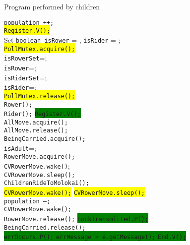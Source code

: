 \documentclass{article}
\begin{document}
\begin{spacing}{1.1}
\begin{algorithm}[bpth]
\caption{Program performed by children}
\begin{algorithmic}[1]
  \STATE \texttt{population ++;}\\
  \STATE \colorbox{yellow}{\texttt{Register.V();}}\\
  \STATE Set \texttt{boolean isRower} = \FALSE, \texttt{isRider} = \FALSE;\\
  \STATE \colorbox{yellow}{\texttt{PollMutex.acquire();}}\\
   \STATE \texttt{isRowerSet}=\TRUE;\\
  \STATE \texttt{isRower}=\TRUE;\\
  \STATE \texttt{isRiderSet}=\TRUE;\\
  \STATE \texttt{isRider}=\TRUE;\\
  \ENDIF
  \STATE \colorbox{yellow}{\texttt{PollMutex.release();}}\\
  \STATE \texttt{Rower();}\\
  \RETURN
  \STATE \texttt{Rider();}
  \RETURN
  \ELSE
  \STATE \colorbox{green}{\texttt{Register.V();}}\\
  \STATE \texttt{AllMove.acquire();}\\
  \STATE \texttt{AllMove.release();}\\
  \STATE \texttt{BeingCarried.acquire();}\\
  \STATE \texttt{isAdult}=\FALSE;\\
  \STATE \texttt{RowerMove.acquire();}\\
  \STATE \texttt{CVRowerMove.wake()};\\
  \STATE \texttt{CVRowerMove.sleep();}\\
  \STATE \texttt{ChildrenRideToMolokai();}\\
  \STATE \colorbox{yellow}{\texttt{CVRowerMove.wake();}}
  \STATE \colorbox{yellow}{\texttt{CVRowerMove.sleep();}}\\
  \STATE \texttt{population --;}\\
  \STATE \texttt{CVRowerMove.wake();}\\
  \STATE \texttt{RowerMove.release();}
  \STATE \colorbox{green}{\texttt{LockTransmitted.P();}}\\
  \STATE \texttt{BeingCarried.release();}\\
  \vbox{\colorbox{green}{\vbox{
    \STATE \texttt{errOccurs.P();}
    \STATE \texttt{errMessage = e.getMessage();}
    \STATE \texttt{End.V();} 
    \ENDIF
  }}}
  \RETURN
  \ENDIF
\end{algorithmic}
\end{algorithm}


\end{spacing}
\end{document}
